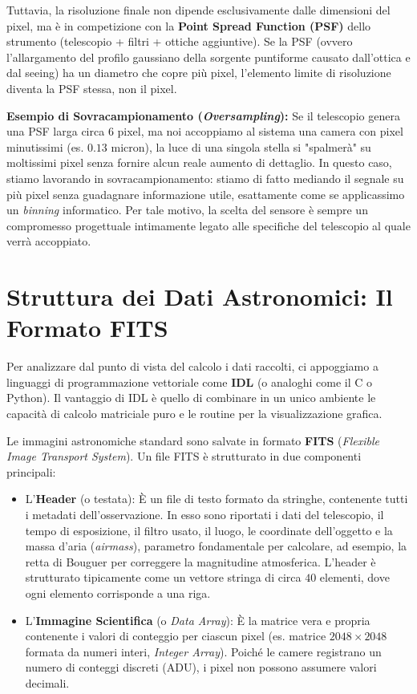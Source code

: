 Tuttavia, la risoluzione finale non dipende esclusivamente dalle dimensioni del pixel, ma è in competizione con la \textbf{Point Spread Function (PSF)} dello strumento (telescopio + filtri + ottiche aggiuntive).
Se la PSF (ovvero l'allargamento del profilo gaussiano della sorgente puntiforme causato dall'ottica e dal seeing) ha un diametro che copre più pixel, l'elemento limite di risoluzione diventa la PSF stessa, non il pixel.

\textbf{Esempio di Sovracampionamento (\textit{Oversampling}):}
Se il telescopio genera una PSF larga circa $6$ pixel, ma noi accoppiamo al sistema una camera con pixel minutissimi (es. $0.13$ micron), la luce di una singola stella si "spalmerà" su moltissimi pixel senza fornire alcun reale aumento di dettaglio. In questo caso, stiamo lavorando in sovracampionamento: stiamo di fatto mediando il segnale su più pixel senza guadagnare informazione utile, esattamente come se applicassimo un \textit{binning} informatico.
Per tale motivo, la scelta del sensore è sempre un compromesso progettuale intimamente legato alle specifiche del telescopio al quale verrà accoppiato.

\section{Struttura dei Dati Astronomici: Il Formato FITS}

Per analizzare dal punto di vista del calcolo i dati raccolti, ci appoggiamo a linguaggi di programmazione vettoriale come \textbf{IDL} (o analoghi come il C o Python). Il vantaggio di IDL è quello di combinare in un unico ambiente le capacità di calcolo matriciale puro e le routine per la visualizzazione grafica.

Le immagini astronomiche standard sono salvate in formato \textbf{FITS} (\textit{Flexible Image Transport System}).
Un file FITS è strutturato in due componenti principali:
\begin{itemize}
\item L'\textbf{Header} (o testata): È un file di testo formato da stringhe, contenente tutti i metadati dell'osservazione. In esso sono riportati i dati del telescopio, il tempo di esposizione, il filtro usato, il luogo, le coordinate dell'oggetto e la massa d'aria (\textit{airmass}), parametro fondamentale per calcolare, ad esempio, la retta di Bouguer per correggere la magnitudine atmosferica. L'header è strutturato tipicamente come un vettore stringa di circa $40$ elementi, dove ogni elemento corrisponde a una riga.
\item L'\textbf{Immagine Scientifica} (o \textit{Data Array}): È la matrice vera e propria contenente i valori di conteggio per ciascun pixel (es. matrice $2048 \times 2048$ formata da numeri interi, \textit{Integer Array}). Poiché le camere registrano un numero di conteggi discreti (ADU), i pixel non possono assumere valori decimali.
\end{itemize}

